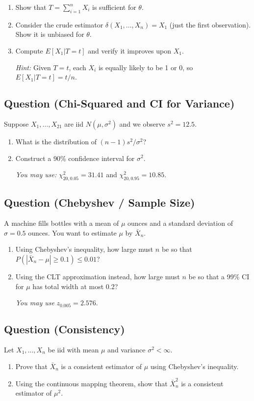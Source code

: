 \documentclass[11pt]{article}
\newcounter{qnum}
\newcommand{\question}[1]{\stepcounter{qnum}\subsection*{Question \theqnum \quad (#1)}}
\begin{document}
\begin{enumerate}[label=(\alph*)]
\item Show that $T = \sum_{i=1}^n X_i$ is sufficient for $\theta$.
\item Consider the crude estimator $\delta(X_1, \ldots, X_n) = X_1$ (just the first observation). Show it is unbiased for $\theta$.
\item Compute $E[X_1 | T = t]$ and verify it improves upon $X_1$.

\textit{Hint:} Given $T = t$, each $X_i$ is equally likely to be 1 or 0, so $E[X_1 | T = t] = t/n$.
\end{enumerate}

\vspace{3in}

\question{Chi-Squared and CI for Variance}
Suppose $X_1, \ldots, X_{21}$ are iid $N(\mu, \sigma^2)$ and we observe $s^2 = 12.5$.

\begin{enumerate}[label=(\alph*)]
\item What is the distribution of $(n-1)s^2/\sigma^2$?
\item Construct a 90\% confidence interval for $\sigma^2$.

\textit{You may use:} $\chi^2_{20, 0.05} = 31.41$ and $\chi^2_{20, 0.95} = 10.85$.
\end{enumerate}

\vspace{2.5in}

\question{Chebyshev / Sample Size}
A machine fills bottles with a mean of $\mu$ ounces and a standard deviation of $\sigma = 0.5$ ounces. You want to estimate $\mu$ by $\bar X_n$.

\begin{enumerate}[label=(\alph*)]
\item Using Chebyshev's inequality, how large must $n$ be so that $P(|\bar X_n - \mu| \ge 0.1) \le 0.01$?
\item Using the CLT approximation instead, how large must $n$ be so that a 99\% CI for $\mu$ has total width at most 0.2?

\textit{You may use} $z_{0.005} = 2.576$.
\end{enumerate}

\vspace{2.5in}

\question{Consistency}
Let $X_1, \ldots, X_n$ be iid with mean $\mu$ and variance $\sigma^2 < \infty$.

\begin{enumerate}[label=(\alph*)]
\item Prove that $\bar X_n$ is a consistent estimator of $\mu$ using Chebyshev's inequality.
\item Using the continuous mapping theorem, show that $\bar X_n^2$ is a consistent estimator of $\mu^2$.
\end{enumerate}
\end{document}
